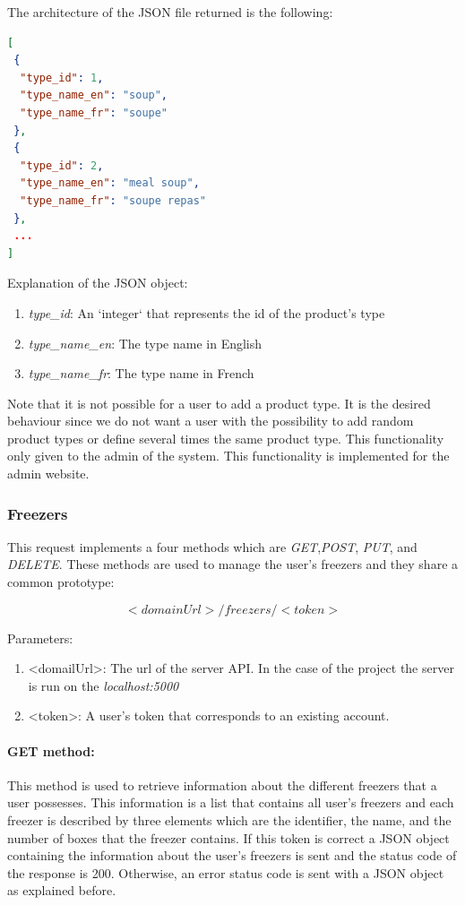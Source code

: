 The architecture of the JSON file returned is the following:
\begin{lstlisting}[language=json]
[
 {
  "type_id": 1,
  "type_name_en": "soup",
  "type_name_fr": "soupe"
 },
 {
  "type_id": 2,
  "type_name_en": "meal soup",
  "type_name_fr": "soupe repas"
 },
 ...
]
\end{lstlisting}

Explanation of the  JSON object:
\begin{enumerate}
\item \textit{type\_id}: An `integer` that represents the id of the product's type
\item \textit{type\_name\_en}: The type name in English
\item \textit{type\_name\_fr}: The type name in French
\end{enumerate}

Note that it is not possible for a user to add a product type. It is the desired behaviour since we do not want a user with the possibility to add random product types or define several times the same product type. This functionality only given to the admin of the system. This functionality is implemented for the admin website.

\subsubsection{Freezers}
This request implements a four methods which are \textit{GET},\textit{POST}, \textit{PUT}, and \textit{DELETE}. These methods are used to manage the user's freezers and they share a common prototype:

$$<domainUrl>/freezers/<token>$$

Parameters:
\begin{enumerate}
\item <domailUrl>: The url of the server API. In the case of the project the server is run on the \textit{localhost:5000}
\item <token>: A user's token that corresponds to an existing account.
\end{enumerate}

\paragraph{GET method:} This method is used to retrieve information about the different freezers that a user possesses. This information is a list that contains all user's freezers and each freezer is described by three elements which are the identifier, the name, and the number of boxes that the freezer contains. If this token is correct a JSON object containing the information about the user's freezers is sent and the status code of the response is 200. Otherwise, an error status code is sent with a JSON object as explained before.\\

